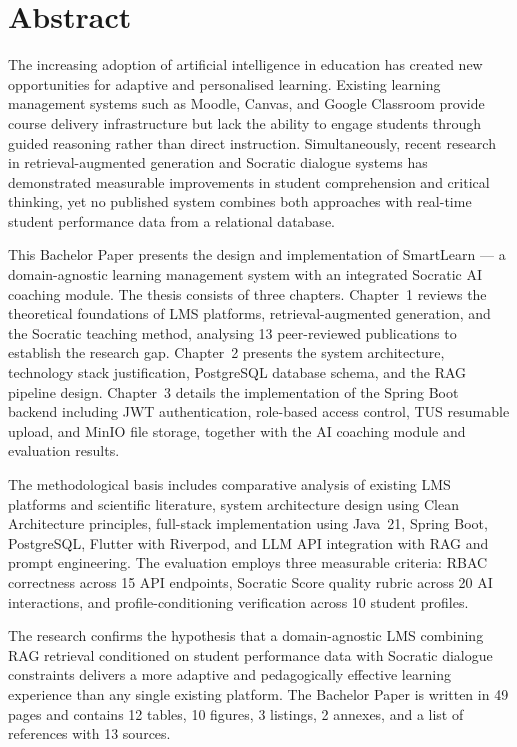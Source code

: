 \documentclass[12pt,a4paper]{report}
\begin{document}
\chapter*{Abstract}

The increasing adoption of artificial intelligence in education has created new
opportunities for adaptive and personalised learning. Existing learning management
systems such as Moodle, Canvas, and Google Classroom provide course delivery
infrastructure but lack the ability to engage students through guided reasoning
rather than direct instruction. Simultaneously, recent research in
retrieval-augmented generation and Socratic dialogue systems has demonstrated
measurable improvements in student comprehension and critical thinking, yet no
published system combines both approaches with real-time student performance data
from a relational database.

This Bachelor Paper presents the design and implementation of SmartLearn --- a
domain-agnostic learning management system with an integrated Socratic AI coaching
module. The thesis consists of three chapters. Chapter~1 reviews the theoretical
foundations of LMS platforms, retrieval-augmented generation, and the Socratic
teaching method, analysing 13 peer-reviewed publications to establish the research
gap. Chapter~2 presents the system architecture, technology stack justification,
PostgreSQL database schema, and the RAG pipeline design. Chapter~3 details the
implementation of the Spring Boot backend including JWT authentication, role-based
access control, TUS resumable upload, and MinIO file storage, together with the AI
coaching module and evaluation results.

The methodological basis includes comparative analysis of existing LMS platforms
and scientific literature, system architecture design using Clean Architecture
principles, full-stack implementation using Java~21, Spring Boot, PostgreSQL,
Flutter with Riverpod, and LLM API integration with RAG and prompt engineering. The
evaluation employs three measurable criteria: RBAC correctness across 15 API
endpoints, Socratic Score quality rubric across 20 AI interactions, and
profile-conditioning verification across 10 student profiles.

The research confirms the hypothesis that a domain-agnostic LMS combining RAG
retrieval conditioned on student performance data with Socratic dialogue constraints
delivers a more adaptive and pedagogically effective learning experience than any
single existing platform. The Bachelor Paper is written in 49 pages and contains 12
tables, 10 figures, 3 listings, 2 annexes, and a list of references with 13 sources.
\end{document}
